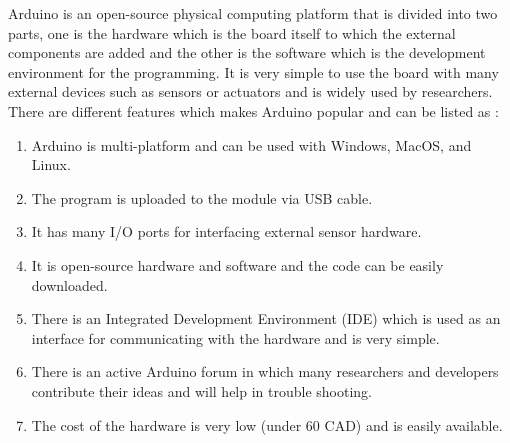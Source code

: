 Arduino is an open-source physical computing platform that is divided into two parts, one is the hardware which is the board itself to which the external components are added and the other is the software which is the development environment for the programming. It is very simple to use the board with many external devices such as sensors or actuators and is widely used by researchers. There are different features which makes Arduino popular and can be listed as \cite{Banzi2008}:


\begin{enumerate}


  \item  Arduino is multi-platform and can be used with Windows, MacOS, and Linux.

  \item The program is uploaded to the module via USB cable.
  \item It has many I/O ports for interfacing external sensor hardware.

  \item It is open-source hardware and software and the code can be easily downloaded.
  
  \item There is an Integrated Development Environment (IDE) which is used as an interface for communicating with the hardware and is very simple.
  
  \item There is an active Arduino forum in which many researchers and developers contribute their ideas and will help in trouble shooting.
  
  \item The cost of the hardware is very low (under 60 CAD) and is easily available.
  
\end{enumerate}

